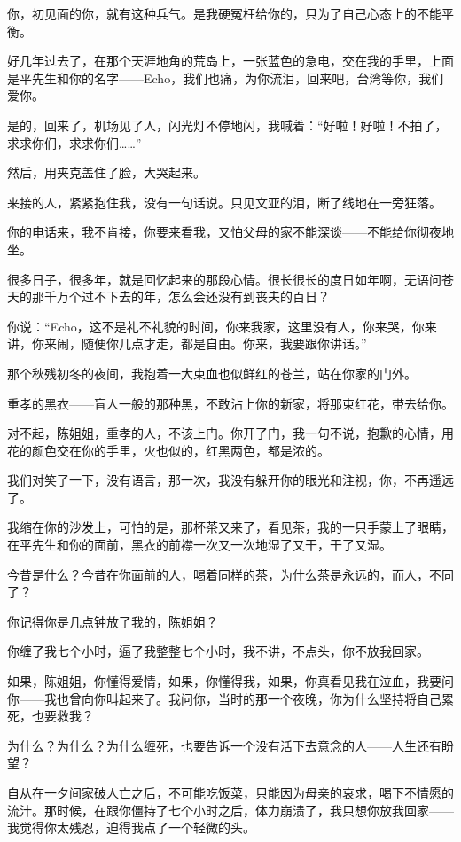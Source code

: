\par 你，初见面的你，就有这种兵气。是我硬冤枉给你的，只为了自己心态上的不能平衡。
\par 好几年过去了，在那个天涯地角的荒岛上，一张蓝色的急电，交在我的手里，上面是平先生和你的名字——Echo，我们也痛，为你流泪，回来吧，台湾等你，我们爱你。
\par 是的，回来了，机场见了人，闪光灯不停地闪，我喊着：“好啦！好啦！不拍了，求求你们，求求你们……”
\par 然后，用夹克盖住了脸，大哭起来。
\par 来接的人，紧紧抱住我，没有一句话说。只见文亚的泪，断了线地在一旁狂落。
\par 你的电话来，我不肯接，你要来看我，又怕父母的家不能深谈——不能给你彻夜地坐。
\par 很多日子，很多年，就是回忆起来的那段心情。很长很长的度日如年啊，无语问苍天的那千万个过不下去的年，怎么会还没有到丧夫的百日？
\par 你说：“Echo，这不是礼不礼貌的时间，你来我家，这里没有人，你来哭，你来讲，你来闹，随便你几点才走，都是自由。你来，我要跟你讲话。”
\par 那个秋残初冬的夜间，我抱着一大束血也似鲜红的苍兰，站在你家的门外。
\par 重孝的黑衣——盲人一般的那种黑，不敢沾上你的新家，将那束红花，带去给你。
\par 对不起，陈姐姐，重孝的人，不该上门。你开了门，我一句不说，抱歉的心情，用花的颜色交在你的手里，火也似的，红黑两色，都是浓的。
\par 我们对笑了一下，没有语言，那一次，我没有躲开你的眼光和注视，你，不再遥远了。
\par 我缩在你的沙发上，可怕的是，那杯茶又来了，看见茶，我的一只手蒙上了眼睛，在平先生和你的面前，黑衣的前襟一次又一次地湿了又干，干了又湿。
\par 今昔是什么？今昔在你面前的人，喝着同样的茶，为什么茶是永远的，而人，不同了？
\par 你记得你是几点钟放了我的，陈姐姐？
\par 你缠了我七个小时，逼了我整整七个小时，我不讲，不点头，你不放我回家。
\par 如果，陈姐姐，你懂得爱情，如果，你懂得我，如果，你真看见我在泣血，我要问你——我也曾向你叫起来了。我问你，当时的那一个夜晚，你为什么坚持将自己累死，也要救我？
\par 为什么？为什么？为什么缠死，也要告诉一个没有活下去意念的人——人生还有盼望？
\par 自从在一夕间家破人亡之后，不可能吃饭菜，只能因为母亲的哀求，喝下不情愿的流汁。那时候，在跟你僵持了七个小时之后，体力崩溃了，我只想你放我回家——我觉得你太残忍，迫得我点了一个轻微的头。
